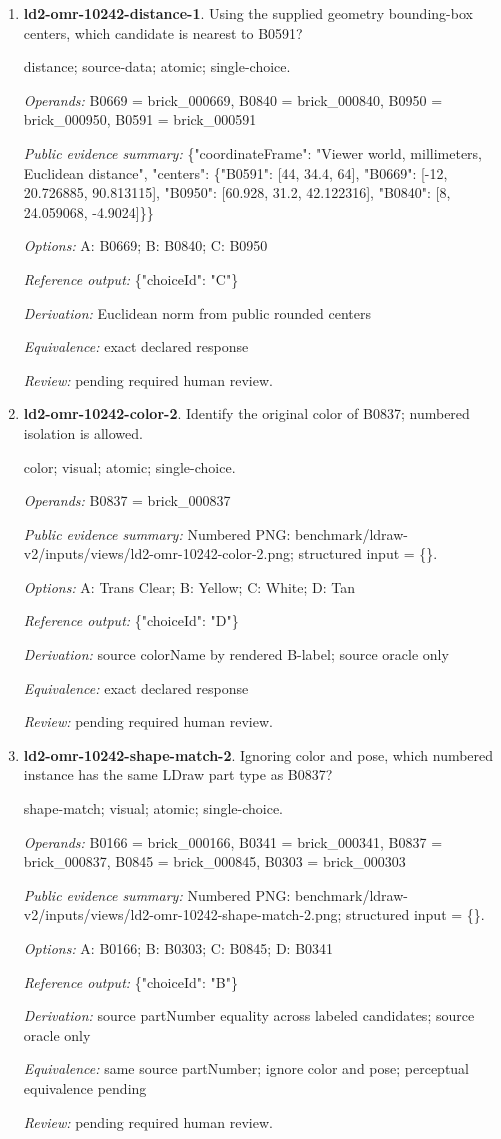 \begin{enumerate}
\item \textbf{ld2-omr-10242-distance-1}. Using the supplied geometry bounding-box centers, which candidate is nearest to B0591?
\par{\small distance; source-data; atomic; single-choice.\par\textit{Operands:} B0669 = brick\_000669, B0840 = brick\_000840, B0950 = brick\_000950, B0591 = brick\_000591\par\textit{Public evidence summary:} \{"coordinateFrame": "Viewer world, millimeters, Euclidean distance", "centers": \{"B0591": [44, 34.4, 64], "B0669": [-12, 20.726885, 90.813115], "B0950": [60.928, 31.2, 42.122316], "B0840": [8, 24.059068, -4.9024]\}\}\par\textit{Options:} A: B0669; B: B0840; C: B0950\par\textit{Reference output:} \{"choiceId": "C"\}\par\textit{Derivation:} Euclidean norm from public rounded centers\par\textit{Equivalence:} exact declared response\par\textit{Review:} pending required human review.}
\item \textbf{ld2-omr-10242-color-2}. Identify the original color of B0837; numbered isolation is allowed.
\par{\small color; visual; atomic; single-choice.\par\textit{Operands:} B0837 = brick\_000837\par\textit{Public evidence summary:} Numbered PNG: benchmark/ldraw-v2/inputs/views/ld2-omr-10242-color-2.png; structured input = \{\}.\par\textit{Options:} A: Trans Clear; B: Yellow; C: White; D: Tan\par\textit{Reference output:} \{"choiceId": "D"\}\par\textit{Derivation:} source colorName by rendered B-label; source oracle only\par\textit{Equivalence:} exact declared response\par\textit{Review:} pending required human review.}
\item \textbf{ld2-omr-10242-shape-match-2}. Ignoring color and pose, which numbered instance has the same LDraw part type as B0837?
\par{\small shape-match; visual; atomic; single-choice.\par\textit{Operands:} B0166 = brick\_000166, B0341 = brick\_000341, B0837 = brick\_000837, B0845 = brick\_000845, B0303 = brick\_000303\par\textit{Public evidence summary:} Numbered PNG: benchmark/ldraw-v2/inputs/views/ld2-omr-10242-shape-match-2.png; structured input = \{\}.\par\textit{Options:} A: B0166; B: B0303; C: B0845; D: B0341\par\textit{Reference output:} \{"choiceId": "B"\}\par\textit{Derivation:} source partNumber equality across labeled candidates; source oracle only\par\textit{Equivalence:} same source partNumber; ignore color and pose; perceptual equivalence pending\par\textit{Review:} pending required human review.}

\end{enumerate}
